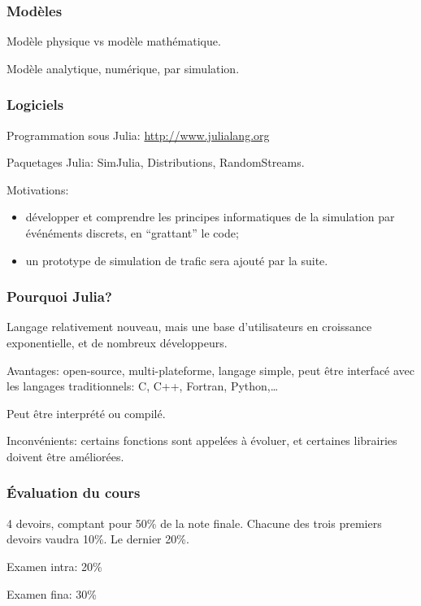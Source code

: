 \documentclass[t,usepdftitle=false]{beamer}
\begin{document}
\begin{frame}
\frametitle{Modèles}

Modèle physique vs modèle mathématique.

\mbox{}

Modèle analytique, numérique, par simulation.

\end{frame}

\begin{frame}
\frametitle{Logiciels}

Programmation sous Julia: \url{http://www.julialang.org}

\mbox{}

Paquetages Julia: SimJulia, Distributions, RandomStreams.

\mbox{}

Motivations:
\begin{itemize}
\item
développer et comprendre les principes informatiques de la simulation par événéments discrets, en ``grattant'' le code;
\item
un prototype de simulation de trafic sera ajouté par la suite.
\end{itemize}

\end{frame}

\begin{frame}
\frametitle{Pourquoi Julia?}

Langage relativement nouveau, mais une base d'utilisateurs en croissance exponentielle, et de nombreux développeurs.

\mbox{}

Avantages: open-source, multi-plateforme, langage simple, peut être interfacé avec les langages traditionnels: C, C++, Fortran, Python,\ldots

\mbox{}

Peut être interprété ou compilé.

\mbox{}

Inconvénients: certains fonctions sont appelées à évoluer, et certaines librairies doivent être améliorées.

\end{frame}

\begin{frame}
\frametitle{Évaluation du cours}

4 devoirs, comptant pour 50\% de la note finale. Chacune des trois premiers devoirs vaudra 10\%. Le dernier 20\%.

\mbox{}

Examen intra: 20\%

\mbox{}

Examen fina: 30\%

\end{frame}
\end{document}
